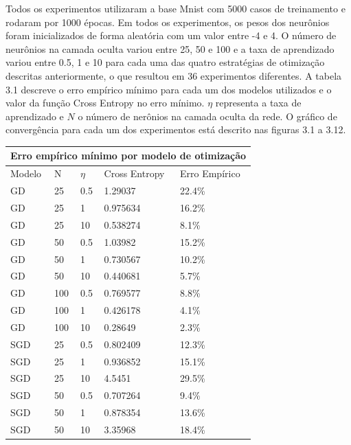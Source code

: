 \documentclass{report}
\begin{document}
Todos os experimentos utilizaram a base Mnist com 5000 casos de treinamento e rodaram por 1000 épocas. Em todos os experimentos,
os pesos dos neurônios foram inicializados de forma aleatória com um valor entre -4 e 4. O número de neurônios
na camada oculta variou entre 25, 50 e 100 e a taxa de aprendizado variou entre 0.5, 1 e 10 para cada uma das quatro
estratégias de otimização descritas anteriormente, o que resultou em 36 experimentos diferentes. A tabela 3.1
descreve o erro empírico mínimo para cada um dos modelos utilizados e o valor da função Cross Entropy no erro mínimo.
$ \eta $ representa a taxa de aprendizado e $ N $ o número de nerônios na camada oculta da rede.
O gráfico de convergência para cada um dos experimentos está descrito nas figuras 3.1 a 3.12.

\begin{table}
\centering
\begin{tabular}{ |l|l|l| l l| }
  \hline
  \multicolumn{5}{|c|}{Erro empírico mínimo por modelo de otimização} \\
  \hline
  Modelo & N & $ \eta $ & Cross Entropy & Erro Empírico \\
  \hline
  GD              & 25   & 0.5 & 1.29037  & 22.4\% \\
  GD              & 25   & 1   & 0.975634 & 16.2\% \\
  GD              & 25   & 10  & 0.538274 & 8.1\%  \\
  \hline
  GD              & 50   & 0.5 & 1.03982  & 15.2\% \\
  GD              & 50   & 1   & 0.730567 & 10.2\% \\
  GD              & 50   & 10  & 0.440681 & 5.7\%  \\
  \hline
  GD              & 100  & 0.5 & 0.769577 & 8.8\%  \\
  GD              & 100  & 1   & 0.426178 & 4.1\%  \\
  GD              & 100  & 10  & 0.28649  & 2.3\%  \\
  \hline
  SGD             & 25  & 0.5  & 0.802409 & 12.3\% \\
  SGD             & 25  & 1    & 0.936852 & 15.1\% \\
  SGD             & 25  & 10   & 4.5451   & 29.5\% \\
  \hline
  SGD             & 50  & 0.5  & 0.707264 & 9.4\% \\
  SGD             & 50  & 1    & 0.878354 & 13.6\% \\
  SGD             & 50  & 10   & 3.35968  & 18.4\% \\

\end{tabular}
\end{table}
\end{document}
